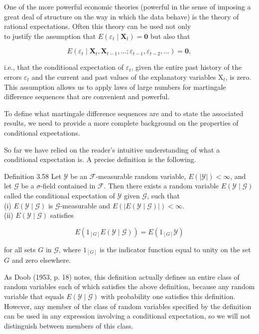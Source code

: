 \documentclass[10pt]{article}
\begin{document}
One of the more powerful economic theories (powerful in the sense of imposing a great deal of structure on the way in which the data behave) is the theory of rational expectations. Often this theory can be used not only\\
to justify the assumption that $E\left(\varepsilon_{t} \mid \mathbf{X}_{t}\right)=\mathbf{0}$ but also that

$$
E\left(\varepsilon_{t} \mid \mathbf{X}_{t}, \mathbf{X}_{t-1}, \ldots ; \varepsilon_{t-1}, \varepsilon_{t-2}, \ldots\right)=\mathbf{0},
$$

i.e., that the conditional expectation of $\varepsilon_{t}$, given the entire past history of the errors $\varepsilon_{t}$ and the current and past values of the explanatory variables $\mathrm{X}_{t}$, is zero. This assumption allows us to apply laws of large numbers for martingale difference sequences that are convenient and powerful.

To define what martingale difference sequences are and to state the associated results, we need to provide a more complete background on the properties of conditional expectations.

So far we have relied on the reader's intuitive understanding of what a conditional expectation is. A precise definition is the following.

Definition 3.58 Let $\mathcal{Y}$ be an $\mathcal{F}$-measurable random variable, $E(|\mathcal{Y}|)<\infty$, and let $\mathcal{G}$ be a $\sigma$-field contained in $\mathcal{F}$. Then there exists a random variable $E(\mathcal{Y} \mid \mathcal{G})$ called the conditional expectation of $\mathcal{Y}$ given $\mathcal{G}$, such that\\
(i) $E(\mathcal{Y} \mid \mathcal{G})$ is $\mathcal{G}$-measurable and $E(|E(\mathcal{Y} \mid \mathcal{G})|)<\infty$.\\
(ii) $E(\mathcal{Y} \mid \mathcal{G})$ satisfies

$$
E\left(1_{[G]} E(\mathcal{Y} \mid \mathcal{G})\right)=E\left(1_{[G]} \mathcal{Y}\right)
$$

for all sets $G$ in $\mathcal{G}$, where $1_{[G]}$ is the indicator function equal to unity on the set $G$ and zero elsewhere.

As Doob (1953, p. 18) notes, this definition actually defines an entire class of random variables each of which satisfies the above definition, because any random variable that equals $E(\mathcal{Y} \mid \mathcal{G})$ with probability one satisfies this definition. However, any member of the class of random variables specified by the definition can be used in any expression involving a conditional expectation, so we will not distinguish between members of this class.
\end{document}
